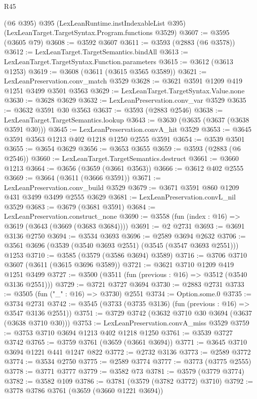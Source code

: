 \begin{lexlean}{R45}
\begin{coremodule}
    (@6 @395)
    @395
    (LexLeanRuntime.instIndexableList @395)
    (LexLeanTarget.TargetSyntax.Program.functions @3529)
@3607 := @3595 (@3605 @79)
@3608 := @3592 @3607
@3611 := @3593 (@2883 (@6 @3578))
@3612 := LexLeanTarget.TargetSemantics.bindAll
@3613 := LexLeanTarget.TargetSyntax.Function.parameters
@3615 := @3612 (@3613 @1253)
@3619 := @3608 (@3611 (@3615 @3565 @3589))
@3621 := LexLeanPreservation.conv_match @3529
@3628 := @3621 @3591 @1209 @419 @1251 @3499 @3501 @3563
@3629 := LexLeanTarget.TargetSyntax.Value.none
@3630 := @3628 @3629
@3632 := LexLeanPreservation.conv_var @3529
@3635 := @3632 @3591 @30 @3563
@3637 := @3593 (@2883 @2546)
@3638 := LexLeanTarget.TargetSemantics.lookup
@3643 := @3630 (@3635 (@3637 (@3638 @3591 @30)))
@3645 := LexLeanPreservation.convA_hit @3529
@3653 := @3645 @3591 @3563 @1213 @402 @1218 @1250 @2555 @3591
@3654 := @3539 @3501
@3655 := @3654 @3629
@3656 := @3653 @3655
@3659 := @3593 (@2883 (@6 @2546))
@3660 := LexLeanTarget.TargetSemantics.destruct
@3661 := @3660 @1213
@3664 := @3656 (@3659 (@3661 @3563))
@3666 := @3612 @402 @2555
@3669 := @3664 (@3611 (@3666 @3591))
@3671 := LexLeanPreservation.conv_build @3529
@3679 := @3671 @3591 @860 @1209 @431 @3499 @3499 @2555 @3629
@3681 := LexLeanPreservation.convL_nil @3529
@3683 := @3679 (@3681 @3591)
@3684 := LexLeanPreservation.construct_none
@3690 := @3558 (fun (index : @16) => @3619 (@3643 (@3669 (@3683 @3684))))
@3691 := @2 @2731
@3693 := @3691 @3136 @2750
@3694 := @3534 @3693
@3696 := @2589 @3694 @2632
@3706 := @3561 @3696 (@3539 (@3540 @3693 @2551) (@3545 (@3547 @3693 @2551))) @1253
@3710 := @3585 (@3579 (@3586 @3694) @3589)
@3716 := @3706 @3710 @3607 (@3611 (@3615 @3696 @3589))
@3721 := @3621 @3710 @1209 @419 @1251 @3499
@3727 := @3500 (@3511 (fun (previous : @16) => @3512 (@3540 @3136 @2551)))
@3729 := @3721 @3727 @3694
@3730 := @2883 @2731
@3733 := @3505 (fun ("_" : @16) => @3730) @2551
@3734 := Option.some.{0}
@3735 := @3734 @2731
@3742 := @3545 (@3733 (@3735 @3136) (fun (previous : @16) => @3547 @3136 @2551))
@3751 := @3729 @3742 (@3632 @3710 @30 @3694 (@3637 (@3638 @3710 @30)))
@3753 := LexLeanPreservation.convA_miss @3529
@3759 := @3753 @3710 @3694 @1213 @402 @1218 @1250
@3761 := @3539 @3727 @3742
@3765 := @3759 @3761 (@3659 (@3661 @3694))
@3771 := @3645 @3710 @3694 @1221 @441 @1247 @822
@3772 := @2732 @3136
@3773 := @2589 @3772
@3774 := @3534 @2750
@3775 := @2589 @3774
@3777 := @3773 (@3775 @2555)
@3778 := @3771 @3777
@3779 := @3582 @73
@3781 := @3579 (@3779 @3774)
@3782 := @3582 @109
@3786 := @3781 (@3579 (@3782 @3772) @3710)
@3792 := @3778 @3786 @3761 (@3659 (@3660 @1221 @3694))

\end{coremodule}
\end{lexlean}
